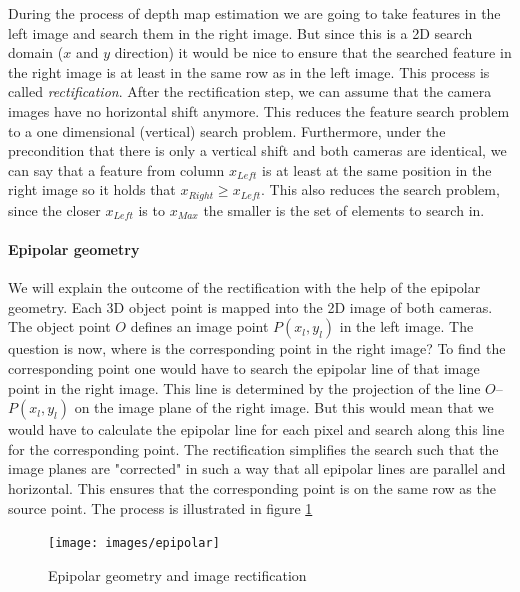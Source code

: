 \documentclass[11pt]{article}
\begin{document}
\bigskip

During the process of depth map estimation we are going to take features in the left image and search them in the right image. But since this is a 2D search domain ($x$ and $y$ direction) it would be nice to ensure that the searched feature in the right image is at least in the same row as in the left image. This process is called \emph{rectification}. After the rectification step, we can assume that the camera images have no horizontal shift anymore. This reduces the feature search problem to a one dimensional (vertical) search problem. Furthermore, under the precondition that there is only a vertical shift and both cameras are identical, we can say that a feature from column $x_{Left}$ is at least at the same position in the right image so it holds that $x_{Right}\geq x_{Left}$. This also reduces the search problem, since the closer $x_{Left}$ is to $x_{Max}$ the smaller is the set of elements to search in.

\paragraph{Epipolar geometry} We will explain the outcome of the rectification with the help of the epipolar geometry. Each 3D object point is mapped into the 2D image of both cameras. The object point $O$ defines an image point $P(x_l,y_l)$ in the left image. The question is now, where is the corresponding point in the right image? To find the corresponding point one would have to search the epipolar line of that image point in the right image. This line is determined by the projection of the line $O$--$P(x_l,y_l)$ on the image plane of the right image. But this would mean that we would have to calculate the epipolar line for each pixel and search along this line for the corresponding point. The rectification simplifies the search such that the image planes are "corrected" in such a way that all epipolar lines are parallel and horizontal. This ensures that the corresponding point is on the same row as the source point. The process is illustrated in figure \ref{fig:epipolar}
 
 \begin{figure}[H]
        \centering
        \texttt{[image: images/epipolar]}
        \caption{Epipolar geometry and image rectification\protect\footnotemark}
        \label{fig:epipolar}
\end{figure}
\end{document}
